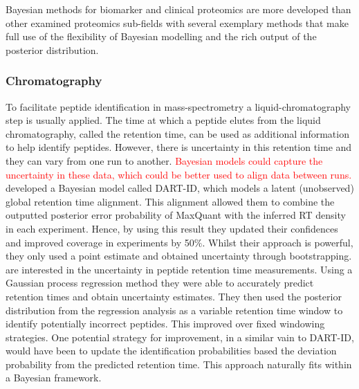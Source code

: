 \documentclass[12pt,english, journal=jpr, layout=twocolumn]{article}
\begin{document}
Bayesian methods for biomarker and clinical proteomics are more developed than other examined proteomics sub-fields with several exemplary methods that make full use of the flexibility of Bayesian modelling and the rich output of the posterior distribution. 
\subsubsection{Chromatography}
To facilitate peptide identification in mass-spectrometry a liquid-chromatography step is usually applied. The time at which a peptide elutes from the liquid chromatography, called the retention time, can be used as additional information to help identify peptides. However, there is uncertainty in this retention time and they can vary from one run to another. \textcolor{red}{Bayesian models could capture the uncertainty in these data, which could be better used to align data between runs.} \citet{Chen::2019} developed a Bayesian model called DART-ID, which models a latent (unobserved) global retention time alignment. This alignment allowed them to combine the outputted posterior error probability of MaxQuant with the inferred RT density in each experiment. Hence, by using this result they updated their confidences and improved coverage in experiments by 50$\%$. Whilst their approach is powerful, they only used a point estimate and obtained uncertainty through bootstrapping. \citet{Maboudi::2017} are interested in the uncertainty in peptide retention time measurements. Using a Gaussian process regression method they were able to accurately predict retention times and obtain uncertainty estimates. They then used the posterior distribution from the regression analysis as a variable retention time window to identify potentially incorrect peptides. This improved over fixed windowing strategies. One potential strategy for improvement, in a similar vain to DART-ID, would have been to update the identification probabilities based the deviation probability from the predicted retention time. This approach naturally fits within a Bayesian framework. 
\end{document}
